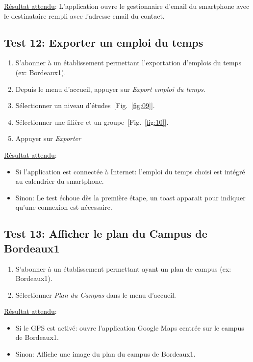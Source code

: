 \documentclass [pdftex,12pt] {report}
\begin{document}
    \underline{Résultat attendu}: L'application ouvre le gestionnaire d'email du smartphone avec le destinataire rempli avec l'adresse email du contact.

  \subsection{Test 12: Exporter un emploi du temps}
    \begin{enumerate}
    \item S'abonner à un établissement permettant l'exportation d'emplois du temps (ex: Bordeaux1).
    \item Depuis le menu d'accueil, appuyer sur \emph{Export emploi du temps}.
    \item Sélectionner un niveau d'études~[Fig.~\ref{fig:09}].
    \item Sélectionner une filière et un groupe~[Fig.~\ref{fig:10}].
    \item Appuyer sur \emph{Exporter}
    \end{enumerate}

    \underline{Résultat attendu}:
    \begin{itemize}
    \item Si l'application est connectée à Internet: l'emploi du temps choisi est intégré au calendrier du smartphone.
    \item Sinon: Le test échoue dès la première étape, un toast apparait pour indiquer qu'une connexion est nécessaire.
    \end{itemize}

  \subsection{Test 13: Afficher le plan du Campus de Bordeaux1}
    \begin{enumerate}
    \item S'abonner à un établissement permettant ayant un plan de campus (ex: Bordeaux1).
    \item Sélectionner \emph{Plan du Campus} dans le menu d'accueil.
    \end{enumerate}

    \underline{Résultat attendu}:
    \begin{itemize}
    \item Si le GPS est activé: ouvre l'application Google Maps centrée sur le campus de Bordeaux1.
    \item Sinon: Affiche une image du plan du campus de Bordeaux1.
    \end{itemize}
\end{document}

